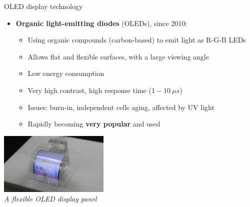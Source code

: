 \begin{frame}{OLED display technology}
  \begin{itemize}
  \item \textbf{Organic light-emitting diodes} (OLEDs), since 2010:
    \begin{itemize}
    \item Using organic compounds (carbon-based) to emit light as R-G-B LEDs
    \item Allows flat and flexible surfaces, with a large viewing angle
    \item Low energy consumption
    \item Very high contrast, high response time (\(1-10~\mu s\))
    \item Issues: burn-in, independent cells aging, affected by UV light
    \item Rapidly becoming \textbf{very popular} and used
    \end{itemize}
  \end{itemize}

  \begin{center}
  \includegraphics[height=8em]{slides/graphics-introduction/oled-display.jpg}\\
  \textit{\small A flexible OLED display panel}
  \end{center}
\end{frame}


